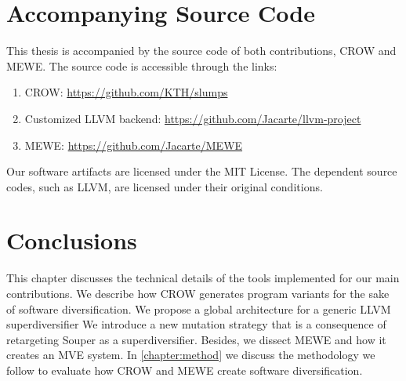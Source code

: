 \section{Accompanying Source Code}

This thesis is accompanied by the source code of both contributions, CROW and MEWE. The source code is accessible through the links:
\begin{enumerate}
    \item CROW: \url{https://github.com/KTH/slumps}
    \item Customized LLVM backend: \url{https://github.com/Jacarte/llvm-project}
    \item MEWE: \url{https://github.com/Jacarte/MEWE}
\end{enumerate}

Our software artifacts are licensed under the MIT License. The dependent source codes, such as LLVM, are licensed under their original conditions.

\section*{Conclusions}

This chapter discusses the technical details of the tools implemented for our main contributions.
We describe how CROW generates program variants for the sake of software diversification.
We propose a global architecture for a generic LLVM superdiversifier
We introduce a new mutation strategy that is a consequence of retargeting Souper as a superdiversifier.
Besides, we dissect MEWE and how it creates an MVE system.
In \autoref{chapter:method} we discuss the methodology we follow to evaluate how CROW and MEWE create software diversification.